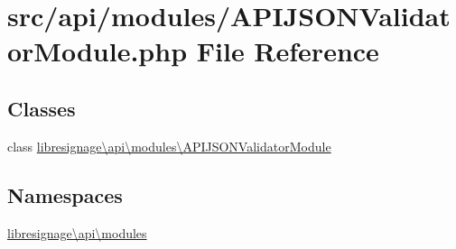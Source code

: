 \hypertarget{APIJSONValidatorModule_8php}{}\section{src/api/modules/\+A\+P\+I\+J\+S\+O\+N\+Validator\+Module.php File Reference}
\label{APIJSONValidatorModule_8php}
\subsection*{Classes}
\begin{DoxyCompactItemize}
\item 
class \hyperlink{classlibresignage_1_1api_1_1modules_1_1APIJSONValidatorModule}{libresignage\textbackslash{}api\textbackslash{}modules\textbackslash{}\+A\+P\+I\+J\+S\+O\+N\+Validator\+Module}
\end{DoxyCompactItemize}
\subsection*{Namespaces}
\begin{DoxyCompactItemize}
\item 
 \hyperlink{namespacelibresignage_1_1api_1_1modules}{libresignage\textbackslash{}api\textbackslash{}modules}
\end{DoxyCompactItemize}
